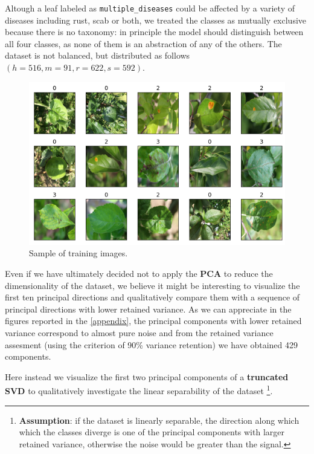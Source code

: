 \documentclass[aps,twocolumn,secnumarabic,nobalancelastpage,amsmath,amssymb,
nofootinbib]{revtex4}
\begin{document}
Altough a leaf labeled as \texttt{multiple\_diseases} could be affected
by a variety of diseases including rust, scab or both, we treated the
classes as mutually exclusive because there is no taxonomy: in principle
the model should distinguish between all four classes, as none of them
is an abstraction of any of the others. The dataset is not balanced, but
distributed as follows \((h = 516, m = 91, r = 622, s = 592)\).

\begin{figure}[h]
	\centering
	\includegraphics[width=0.9\linewidth]{Images/InputImages}
	\caption{Sample of training images.}
	\label{fig:inputimages}
\end{figure}


Even if we have ultimately decided not to apply the \textbf{PCA} to
reduce the dimensionality of the dataset, we believe it might be
interesting to visualize the first ten principal directions and
qualitatively compare them with a sequence of principal directions with
lower retained variance. As we can appreciate in the figures reported in
the \ref{appendix}, the principal components with
lower retained variance correspond to almost pure noise and from the
retained variance assesment (using the criterion of 90\% variance
retention) we have obtained 429 components.

Here instead we visualize the first two principal components of a
\textbf{truncated SVD} to qualitatively investigate the linear
separability of the dataset \footnote{\textbf{Assumption}: if the
	dataset is linearly separable, the direction along which which the
	classes diverge is one of the principal components with larger
	retained variance, otherwise the noise would be greater than the
	signal.}.
\end{document}
